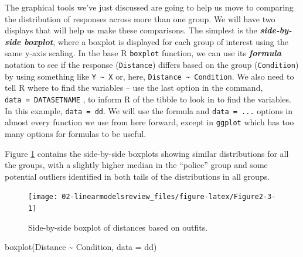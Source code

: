 \documentclass[
]{book}
\newenvironment{Shaded}{\begin{snugshade}}{\end{snugshade}}
\newcommand{\AttributeTok}[1]{\textcolor[rgb]{0.77,0.63,0.00}{#1}}
\newcommand{\FunctionTok}[1]{\textcolor[rgb]{0.00,0.00,0.00}{#1}}
\newcommand{\NormalTok}[1]{#1}
\newcommand{\SpecialCharTok}[1]{\textcolor[rgb]{0.00,0.00,0.00}{#1}}
\begin{document}
\indent The graphical tools we've just discussed are going to help us move to comparing the
distribution of responses across more than one group. We will have two displays
that will help us make these comparisons. The simplest is
the \textbf{\emph{side-by-side boxplot}}, where a boxplot is displayed for each group
of interest using the same y-axis scaling.  In the base R \texttt{boxplot} function, we can use its \textbf{\emph{formula}}
notation to see if the response (\texttt{Distance}) differs based on the group
(\texttt{Condition}) by using something like \texttt{Y\ \textasciitilde{}\ X} or, here, \texttt{Distance\ \textasciitilde{}\ Condition}.
We also need to tell R where to find the variables -- use the last option in the command, \texttt{data\ =\ DATASETNAME} , to inform R of the tibble to look in
to find the variables. In this example, \texttt{data\ =\ dd}. We will use
the formula and \texttt{data\ =\ ...} options in almost every function we use
from here forward, except in \texttt{ggplot} which has too many options for formulas to be useful.

\indent Figure \ref{fig:Figure2-3} contains the side-by-side
boxplots showing similar distributions for all the groups, with a slightly higher median in the ``police'' group and some potential outliers identified in both tails of the distributions in all groups.



\begin{figure}[ht!]

{\centering \texttt{[image: 02-linearmodelsreview\_files/figure-latex/Figure2-3-1]} 

}

\caption{Side-by-side boxplot of distances based on outfits.}\label{fig:Figure2-3}
\end{figure}

\begin{Shaded}
\begin{Highlighting}[]
\FunctionTok{boxplot}\NormalTok{(Distance }\SpecialCharTok{\textasciitilde{}}\NormalTok{ Condition, }\AttributeTok{data =}\NormalTok{ dd)}
\end{Highlighting}
\end{Shaded}
\end{document}
